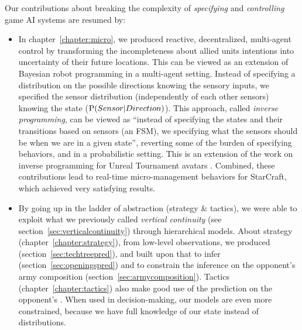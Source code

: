 Our contributions about breaking the complexity of \textit{specifying} and \textit{controlling} game AI systems are resumed by:
\begin{itemize}
    \item In chapter~\ref{chapter:micro}, we produced reactive, decentralized, multi-agent control by transforming the incompleteness about allied units intentions into uncertainty of their future locations. This can be viewed as an extension of Bayesian robot programming \citep{Lebeltel04} in a multi-agent setting. Instead of specifying a distribution on the possible directions knowing the sensory inputs, we specified the sensor distribution (independently of each other sensors) knowing the state ($\mathrm{P}(Sensor|Direction)$). This approach, called \textit{inverse programming}, can be viewed as ``instead of specifying the states and their transitions based on sensors (an FSM), we specifying what the sensors should be when we are in a given state'', reverting some of the burden of specifying behaviors, and in a probabilistic setting. This is an extension of the work on inverse programming for Unreal Tournament avatars \citep{LeHy04}. Combined, these contributions lead to real-time micro-management behaviors for StarCraft, which achieved very satisfying results.

    \item By going up in the ladder of abstraction (strategy \& tactics), we were able to exploit what we previously called \textit{vertical continuity} (see section~\ref{sec:verticalcontinuity}) through hierarchical models. About strategy (chapter~\ref{chapter:strategy}), from low-level observations, we produced  (section~\ref{sec:techtreepred}), and built upon that to infer  (section~\ref{sec:openingspred}) and to constrain the inference on the opponent's army composition (section~\ref{sec:armycomposition}). Tactics (chapter~\ref{chapter:tactics}) also make good use of the prediction on the opponent's . When used in decision-making, our models are even more constrained, because we have full knowledge of our state instead of distributions.


\end{itemize}
